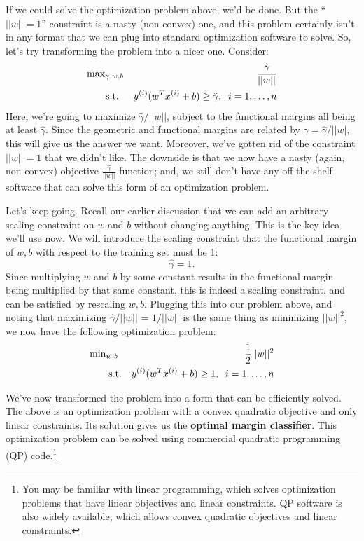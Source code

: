 \documentclass{article}
\begin{document}
If we could solve the optimization problem above, we'd be done.  But the ``$||w||=1$'' constraint is a nasty
(non-convex) one, and this problem certainly isn't in any format that we can plug into standard optimization
software to solve.  So, let's try transforming the problem into a nicer one. Consider:
\begin{eqnarray*}
&\hbox{max}_{\hat\gamma,w,b}& \frac{\hat\gamma}{||w||} \\
&\;\;\;\;\;\;\;\hbox{s.t.}& {y^{(i)}} (w^T{x^{(i)}} + b) \geq \hat\gamma,\;\; i=1, \ldots, {n}
\end{eqnarray*}
Here, we're going to maximize $\hat\gamma/||w||$, subject to the functional margins all
being at least $\hat\gamma$.  Since the geometric and functional margins are related by
$\gamma = \hat\gamma/||w|$, this will give us the answer we want.  Moreover, we've gotten
rid of the constraint $||w||=1$ that we didn't like.  The downside is that we now
have a nasty (again, non-convex) objective $\frac{\hat\gamma}{||w||}$ function; and,
we still don't have any off-the-shelf software that can solve this form of an optimization problem.

Let's keep going.  Recall our earlier discussion that we can add an arbitrary scaling constraint
on $w$ and $b$ without changing anything.  This is the key idea we'll use now.  We will introduce the scaling
constraint that the functional margin of $w,b$ with respect to the training set must be 1:
\[
\hat\gamma = 1.
\]
Since multiplying $w$ and $b$ by some constant results in the functional margin being multiplied
by that same constant, this is indeed a scaling constraint, and can be satisfied by rescaling $w,b$.
Plugging this into our problem above, and noting that maximizing
$\hat\gamma/||w||$ = $1/||w||$
is the
same thing as minimizing $||w||^2$, we now have the following optimization problem:
\begin{eqnarray*}
&\hbox{min}_{w,b}& \frac{1}{2} ||w||^2 \\
&\;\;\;\;\;\;\;\hbox{s.t.}& {y^{(i)}} (w^T{x^{(i)}} + b) \geq 1,\;\; i=1, \ldots, {n}
\end{eqnarray*}

We've now transformed the problem into a form that can be efficiently solved.  The above is an
optimization problem with a convex quadratic objective and only linear constraints.  Its
solution gives us the {\bf optimal margin classifier}.  This optimization problem can
be solved using commercial quadratic programming (QP) code.\footnote{You may be familiar with
linear programming, which solves optimization problems that have linear objectives and
linear constraints.  QP software is also widely available, which allows convex quadratic
objectives and linear constraints.}
\end{document}
